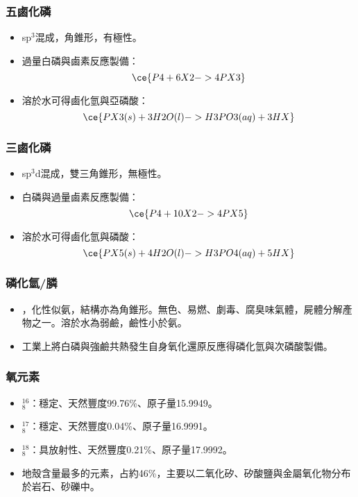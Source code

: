\documentclass[a4paper,12pt]{report}
\begin{document}
\subsubsection{五鹵化磷}
\begin{itemize}
\item sp$^3$混成，角錐形，有極性。
\item 過量白磷與鹵素反應製備：
\[\ce{P4 + 6X2 -> 4PX3}\]
\item 溶於水可得鹵化氫與亞磷酸：
\[\ce{PX3(s) + 3H2O(l) -> H3PO3(aq) + 3HX}\]
\end{itemize}
\subsubsection{三鹵化磷}
\begin{itemize}
\item sp$^3$d混成，雙三角錐形，無極性。
\item 白磷與過量鹵素反應製備：
\[\ce{P4 + 10X2 -> 4PX5}\]
\item 溶於水可得鹵化氫與磷酸：
\[\ce{PX5(s) + 4H2O(l) -> H3PO4(aq) + 5HX}\]
\end{itemize}
\subsubsection{磷化氫/膦}
\begin{itemize}
\item {}，化性似氨，結構亦為角錐形。無色、易燃、劇毒、腐臭味氣體，屍體分解產物之一。溶於水為弱鹼，鹼性小於氨。
\item 工業上將白磷與強鹼共熱發生自身氧化還原反應得磷化氫與次磷酸製備。
\end{itemize}
\subsubsection{氧元素}
\begin{itemize}
\item $^{16}_8$\rmO：穩定、天然豐度99.76\%、原子量15.9949。
\item $^{17}_8$\rmO：穩定、天然豐度0.04\%、原子量16.9991。
\item $^{18}_8$\rmO：具放射性、天然豐度0.21\%、原子量17.9992。
\item 地殼含量最多的元素，占約46\%，主要以二氧化矽、矽酸鹽與金屬氧化物分布於岩石、砂礫中。
\end{itemize}
\end{document}
